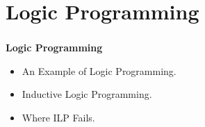 \documentclass[bigger]{beamer}
\begin{document}
\section{Logic Programming}
%
\begin{frame}
    \frametitle{}
    \begin{center}
        \vfill
        {\huge\bf Logic Programming}
    \end{center}
    \vfill
    \begin{itemize}
        \item An Example of Logic Programming.
        \item Inductive Logic Programming.
        \item Where ILP Fails.
    \end{itemize}
    \vfill
\end{frame}
%
\end{document}
